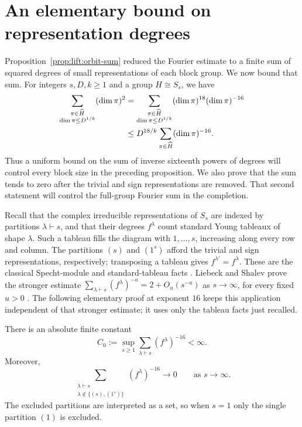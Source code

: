 \section{An elementary bound on representation degrees}
\label{sec:degrees}

Proposition~\ref{prop:lift:orbit-sum} reduced the Fourier estimate to a
finite sum of squared degrees of small representations of each block
group. We now bound that sum. For integers $s,D,k\ge1$ and a
group $H\cong S_s$, we have
\begin{align}
 \sum_{\substack{\pi\in\widehat H\\\dim\pi\le D^{1/k}}}(\dim\pi)^2
 &=\sum_{\substack{\pi\in\widehat H\\\dim\pi\le D^{1/k}}}
       (\dim\pi)^{18}(\dim\pi)^{-16}\notag\\
 &\le D^{18/k}\sum_{\pi\in\widehat H}(\dim\pi)^{-16}.
\label{eq:degrees:truncated-sum}
\end{align}
Thus a uniform bound on the sum of inverse sixteenth powers of degrees will
control every block size in the preceding proposition. We also prove that
the sum tends to zero after the trivial and sign representations are
removed. That second statement will control the full-group Fourier sum
in the completion.

Recall that the complex irreducible representations of $S_s$ are indexed
by partitions $\lambda\vdash s$, and that their degrees $f^\lambda$ count
standard Young tableaux of shape $\lambda$. Such a tableau fills the
diagram with $1,\ldots,s$, increasing along every row and column. The
partitions $(s)$ and $(1^s)$ afford the trivial and sign representations,
respectively; transposing a tableau gives
$f^{\lambda'}=f^\lambda$.
These are the classical Specht-module and standard-tableau facts
\cite{sagan,etingof}. Liebeck and Shalev prove the stronger estimate
$\sum_{\lambda\vdash s}(f^\lambda)^{-u}=2+O_u(s^{-u})$
as $s\to\infty$, for every fixed $u>0$
\cite[Theorems~1.1 and~2.6]{liebeck-shalev2004}.
The following elementary proof at exponent $16$ keeps this application
independent of that stronger estimate; it uses only the tableau facts just
recalled.

\begin{lemma}
\label{lem:degrees}
There is an absolute finite constant
\begin{equation}
  C_0:=\sup_{s\ge 1}\sum_{\lambda\vdash s}(f^\lambda)^{-16}<\infty.
  \label{eq:degrees:uniform}
\end{equation}
Moreover,
\begin{equation}
  \sum_{\substack{\lambda\vdash s\\
                  \lambda\notin\{(s),(1^s)\}}}
       (f^\lambda)^{-16}\longrightarrow 0
       \qquad\text{as }s\longrightarrow\infty.
  \label{eq:degrees:vanishing}
\end{equation}
The excluded partitions are interpreted as a set, so when $s=1$ only
the single partition $(1)$ is excluded.
\end{lemma}

